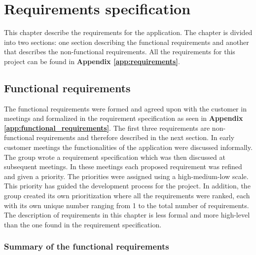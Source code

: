 
\chapter{Requirements specification}

This chapter describe the requirements for the application. The chapter is divided into two sections: one section describing the functional requirements and another that describes the non-functional requirements. All the requirements for this project can be found in \textbf{Appendix \ref{app:requirements}}.

\section{Functional requirements}

The functional requirements were formed and agreed upon with the customer in meetings and formalized in the requirement specification as seen in \textbf{Appendix \ref{app:functional_requirements}}. The first three requirements are non-functional requirements and therefore described in the next section. In early customer meetings the functionalities of the application were discussed informally. The group wrote a requirement specification which was then discussed at subsequent meetings. In these meetings each proposed requirement was refined and given a priority. The priorities were assigned using a high-medium-low scale. This priority has guided the development process for the project. In addition, the group created its own prioritization where all the requirements were ranked, each with its own unique number ranging from 1 to the total number of requirements. The description of requirements in this chapter is less formal and more high-level than the one found in the requirement specification. 

\subsection{Summary of the functional requirements}
\label{subsec:summary_functional_requirements}

